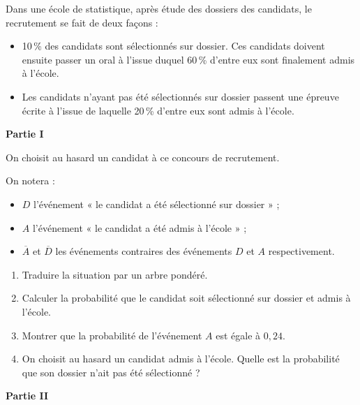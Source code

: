 Dans une école de statistique, après étude des dossiers des candidats, le recrutement se fait de deux façons :

\begin{itemize}
	\item 10\,\% des candidats sont sélectionnés sur dossier. Ces candidats doivent ensuite passer un oral à 
	l’issue duquel 60\,\% d’entre eux sont finalement admis à l’école. 
	\item Les candidats n’ayant pas été sélectionnés sur dossier passent une épreuve écrite à l’issue de laquelle 
	20\,\% d’entre eux sont admis à l’école. 
\end{itemize}

\begin{center}
	\textbf{Partie I}
\end{center} 

On choisit au hasard un candidat à ce concours de recrutement.  

On notera :

\begin{itemize}
	\item $D$ l’événement « le candidat a été sélectionné sur dossier » ; 
	\item $A$ l’événement « le candidat a été admis à l’école » ; 
	\item $\overline{A}$ et $\overline{D}$ les événements contraires des événements $D$ et $A$ respectivement. 
\end{itemize}

\begin{enumerate}
	\item Traduire la situation par un arbre pondéré.
	\item Calculer la probabilité que le candidat soit sélectionné sur dossier et admis à l’école.
	\item Montrer que la probabilité de l’événement $A$ est égale à $0,24$.
	\item On choisit au hasard un candidat admis à l’école. Quelle est la probabilité que son dossier n’ait pas été sélectionné ? 
\end{enumerate}

\begin{center}
	\textbf{Partie II}
\end{center} 

